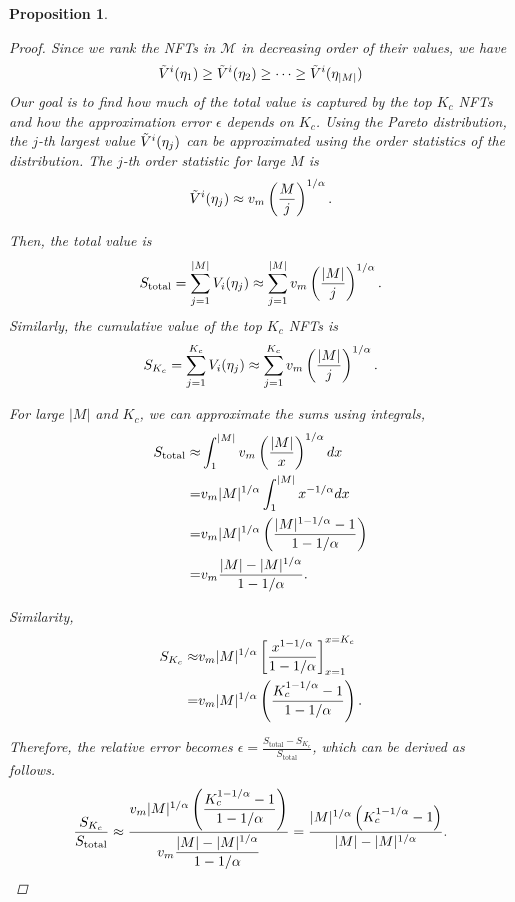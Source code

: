 \documentclass[conference]{IEEEtran}
\newcommand{\1}[1]{\mathds{1}\left[#1\right]}
\theoremstyle{plain}
\newtheorem{proposition}{Proposition}
\begin{document}
\begin{proposition}
{\begin{proof}
Since we rank the NFTs in $\mathcal{M}$ in decreasing order of their values, we have
\begin{equation}\small
    \Tilde{V}^i(\eta_1) \geq \Tilde{V}^i(\eta_2) \geq \dots \geq \Tilde{V}^i(\eta_{|M|})
\end{equation}
Our goal is to find how much of the total value is captured by the top $K_c$ NFTs and how the approximation error $\epsilon$ depends on $K_c$. Using the Pareto distribution, the $j$-th largest value $\Tilde{V}^i(\eta_j)$ can be approximated using the order statistics of the distribution. The $j$-th order statistic for large $M$ is
\begin{equation}\small
    \Tilde{V}^i(\eta_j) \approx v_m \left( \frac{M}{j} \right)^{1/\alpha}.
\end{equation}

Then, the total value is
\begin{equation}\small
    S_{\text{total}} = \sum_{j=1}^{|M|} V_i(\eta_j) \approx \sum_{j=1}^{|M|} v_m \left( \frac{|M|}{j} \right)^{1/\alpha}.
\end{equation}
Similarly, the cumulative value of the top $K_c$ NFTs is 
\begin{equation}\small
    S_{K_c} = \sum_{j=1}^{K_c} V_i(\eta_j) \approx \sum_{j=1}^{K_c} v_m \left( \frac{|M|}{j} \right)^{1/\alpha}.
\end{equation}

For large $|M|$ and $K_c$, we can approximate the sums using integrals,
\begin{align*}\small
    S_{\text{total}} \approx & \int_{1}^{|M|} v_m \left( \frac{|M|}{x} \right)^{1/\alpha} dx  \\ = & v_m |M|^{1/\alpha} \int_{1}^{|M|} x^{-1/\alpha} dx \\ = & v_m |M|^{1/\alpha} \left( \frac{|M|^{1 - 1/\alpha} - 1}{1 - 1/\alpha} \right)
    \\ = & v_m \frac{|M| - |M|^{1/\alpha}}{1 - 1/\alpha}.
\end{align*}

Similarity, 
\begin{align*}\small
    S_{K_c} \approx &  v_m |M|^{1/\alpha} \left[ \frac{x^{1 - 1/\alpha}}{1 - 1/\alpha} \right]_{x=1}^{x=K_c} \\ = &  v_m |M|^{1/\alpha} \left( \frac{K_c^{1 - 1/\alpha} - 1}{1 - 1/\alpha} \right).
\end{align*}

Therefore, the relative error becomes $\epsilon = \frac{S_{\text{total}} - S_{K_c}}{S_{\text{total}}}$, which can be derived as follows.
\begin{equation}\small
    \frac{S_{K_c}}{S_{\text{total}}} \approx \frac{v_m |M|^{1/\alpha} \left( \dfrac{K_c^{1 - 1/\alpha} - 1}{1 - 1/\alpha} \right)}{v_m \dfrac{|M| - |M|^{1/\alpha}}{1 - 1/\alpha}} = \frac{|M|^{1/\alpha} \left( K_c^{1 - 1/\alpha} - 1 \right)}{|M| - |M|^{1/\alpha}}.
\end{equation}


\end{proof}}
\end{proposition}
\end{document}
